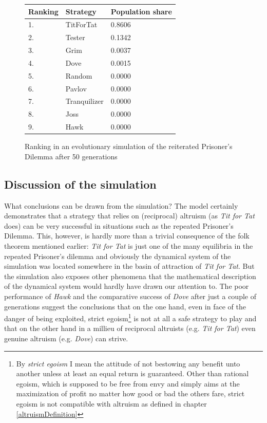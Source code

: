 \begin{figure}
\begin{center}
\begin{tabular}{lll}
Ranking & Strategy        & Population share \\ \hline

1.      & TitForTat       & 0.8606 \\
2.      & Tester          & 0.1342 \\
3.      & Grim            & 0.0037 \\
4.      & Dove            & 0.0015 \\
5.      & Random          & 0.0000 \\
6.      & Pavlov          & 0.0000 \\
7.      & Tranquilizer    & 0.0000 \\
8.      & Joss            & 0.0000 \\
9.      & Hawk            & 0.0000 \\
\end{tabular}
\caption{\label{BasicTournament2} Ranking in an evolutionary simulation of the
 reiterated Prisoner's Dilemma after 50 generations}
\end{center}
\end{figure}

\subsection{Discussion of the simulation}
\label{simpleSimDiscussion}

What conclusions can be drawn from the simulation? The model certainly
demonstrates that a strategy that relies on (reciprocal) altruism (as {\em Tit
  for Tat} does) can be very successful in situations such as the repeated
Prisoner's Dilemma. This, however, is hardly more than a trivial consequence
of the folk theorem mentioned earlier: {\em Tit for Tat} is just one of the
many equilibria in the repeated Prisoner's dilemma and obviously the dynamical
system of the simulation was located somewhere in the basin of attraction of {\em
  Tit for Tat}. But the simulation also exposes other phenomena that the
mathematical description of the dynamical system would hardly have drawn our
attention to. The poor performance of {\em Hawk} and the comparative success of
{\em Dove} after just a couple of generations suggest the conclusions that on
the one hand, even in face of the danger of being exploited, strict
egoism\footnote{By {\em strict egoism} I mean the attitude of not bestowing
  any benefit unto another unless at least an equal return is guaranteed.
  Other than rational egoism, which is supposed to be free from envy and
  simply aims at the maximization of profit no matter how good or bad the
  others fare, strict egoism is not compatible with altruism as
  defined in chapter \ref{altruismDefinition}} is not at all a safe strategy
to play and that on the other hand in a millieu of reciprocal altruists (e.g. {\em
  Tit for Tat}) even genuine altruism (e.g. {\em Dove}) can strive.

